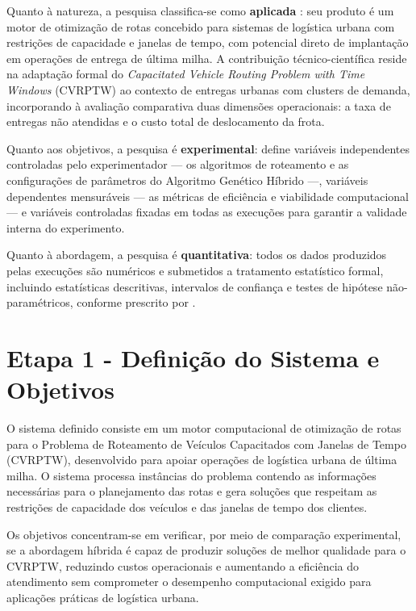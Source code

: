 Quanto à natureza, a pesquisa classifica-se como \textbf{aplicada} \cite{gil2022}: seu
produto é um motor de otimização de rotas concebido para sistemas de logística urbana
com restrições de capacidade e janelas de tempo, com potencial direto de implantação
em operações de entrega de última milha. A contribuição técnico-científica reside na
adaptação formal do \textit{Capacitated Vehicle Routing Problem with Time Windows}
(CVRPTW) ao contexto de entregas urbanas com clusters de demanda, incorporando à
avaliação comparativa duas dimensões operacionais: a taxa de entregas não atendidas e
o custo total de deslocamento da frota.

Quanto aos objetivos, a pesquisa é \textbf{experimental}: define variáveis
independentes controladas pelo experimentador --- os algoritmos de roteamento e as
configurações de parâmetros do Algoritmo Genético Híbrido ---, variáveis dependentes
mensuráveis --- as métricas de eficiência e viabilidade computacional --- e variáveis
controladas fixadas em todas as execuções para garantir a validade interna do
experimento.

Quanto à abordagem, a pesquisa é \textbf{quantitativa}: todos os dados produzidos
pelas execuções são numéricos e submetidos a tratamento estatístico formal, incluindo
estatísticas descritivas, intervalos de confiança e testes de hipótese
não-paramétricos, conforme prescrito por .

\section{Etapa 1 - Definição do Sistema e Objetivos}
\label{sec:etapa1}

O sistema definido consiste em um motor computacional de otimização de rotas para o
Problema de Roteamento de Veículos Capacitados com Janelas de Tempo (CVRPTW),
desenvolvido para apoiar operações de logística urbana de última milha. O sistema
processa instâncias do problema contendo as informações necessárias para o
planejamento das rotas e gera soluções que respeitam as restrições de capacidade dos
veículos e das janelas de tempo dos clientes.

Os objetivos concentram-se em verificar, por meio de comparação experimental, se a
abordagem híbrida é
capaz de produzir soluções de melhor qualidade para o CVRPTW, reduzindo custos
operacionais e aumentando a eficiência do atendimento sem comprometer o desempenho
computacional exigido para aplicações práticas de logística urbana.

